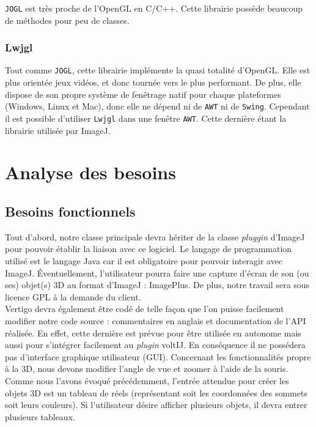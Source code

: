 \documentclass[11pt]{report}
\begin{document}
\texttt{JOGL} est très proche de l'OpenGL en C/C++. Cette librairie possède beaucoup de méthodes pour peu de classes.


\subsection{Lwjgl}
Tout comme \texttt{JOGL}, cette librairie implémente la quasi totalité d'OpenGL. Elle est plus orientée jeux vidéos, et donc tournée vers le plus performant. De plus, elle dispose de son propre système de fenêtrage natif pour chaque plateformes (Windows, Linux et Mac), donc elle ne dépend ni de \texttt{AWT} ni de \texttt{Swing}. 
Cependant il est possible d'utiliser \texttt{Lwjgl} dans une fenêtre \texttt{AWT}.
Cette dernière étant la librairie utilisée par ImageJ.

\chapter{Analyse des besoins}

\section{Besoins fonctionnels}
Tout d'abord, notre classe principale devra hériter de la classe \textit{pluggin} d'ImageJ pour pouvoir établir la liaison avec ce logiciel.
Le langage de programmation utilisé est le langage Java car il est obligatoire pour pouvoir interagir avec ImageJ. Éventuellement, l'utilisateur pourra faire une capture d'écran de son (ou ses) objet(s) 3D au format d'ImageJ : ImagePlus.
De plus, notre travail sera sous licence GPL à la demande du client.\\

Vertigo devra également être codé de telle façon que l'on puisse facilement modifier notre code source : commentaires en anglais et documentation de l'API réalisée. En effet, cette dernière est prévue pour être utilisée en autonome mais aussi pour s'intégrer facilement au \textit{plugin} voltIJ. En conséquence il ne possédera pas d'interface graphique utilisateur (GUI).
Concernant les fonctionnalités propre à la 3D, nous devons modifier l'angle de vue et zoomer  à l'aide de la souris.
Comme nous l'avons évoqué précédemment, l'entrée attendue pour créer les objets 3D est un tableau de réels (représentant soit les coordonnées des sommets soit leurs couleurs). Si l'utilisateur désire afficher plusieurs objets, il devra entrer plusieurs tableaux.\\
\end{document}

